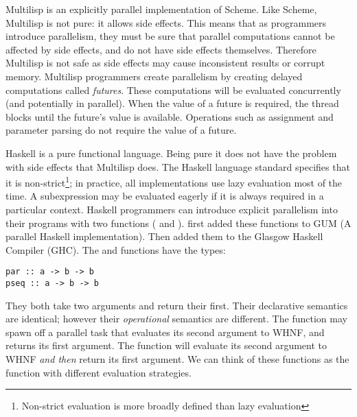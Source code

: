 Multilisp \citep*{halstead:1984:multilisp,halstead:1985:multilisp} is an
explicitly parallel implementation of Scheme.
Like Scheme, Multilisp is not pure: it allows side effects.
This means that as programmers introduce parallelism, they must be sure that
parallel computations cannot be affected by side effects,
and do not have side effects themselves.
Therefore Multilisp is not safe as side effects may cause inconsistent
results or corrupt memory.
Multilisp programmers create parallelism by creating delayed computations
called \emph{futures}.
These computations will be evaluated concurrently
(and potentially in parallel).
When the value of a future is required,
the thread blocks until the future's value is available.
Operations such as assignment and parameter parsing do not require the
value of a future.

Haskell is a pure functional language.
Being pure it does not have the problem with side effects that Multilisp
does.
The Haskell language standard specifies that it is non-strict\footnote{
    Non-strict evaluation is more broadly defined than lazy evaluation};
in practice, all implementations use lazy evaluation most of the time.
A subexpression may be evaluated eagerly if it is always required in a
particular context.
Haskell programmers can introduce explicit parallelism into their programs
with two functions ( and ).
\citet{gph:gum}
first added these functions to GUM (A parallel Haskell implementation).
Then \citet{harris:2005:haskell-smp} added them to the
Glasgow Haskell Compiler (GHC).
The  and  functions have the types:

\begin{verbatim}
par :: a -> b -> b
pseq :: a -> b -> b
\end{verbatim}
They both take two arguments and return their first.
Their declarative semantics are identical;
however their \emph{operational} semantics are different.
The  function may spawn off a parallel task that evaluates its
second argument to WHNF,
and returns its first argument.
The  function will evaluate its second argument to WHNF
\emph{and then} return its first argument.
We can think of these functions as the  function
with different evaluation strategies.

